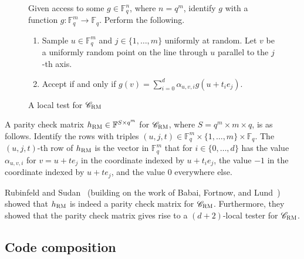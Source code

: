 \documentclass[11pt]{article}
\newtheorem{theorem}{Theorem}[section]
\theoremstyle{definition}
\newcommand{\code}{\mathscr{C}}
\newcommand{\F}{\ensuremath{\mathbb{F}}}
\newcommand{\mX}{\ensuremath{\mathcal{X}}}
\newcommand{\RM}{\ensuremath{\textsc{RM}}}
\DeclareMathOperator{\poly}{poly}
\newcommand{\eps}{\varepsilon}
\newenvironment{gamespec}{
  \begin{mdframed}[style=figstyle]}{
  \end{mdframed}}
\begin{document}
\begin{figure}[!htbp]
  \centering
  \begin{gamespec}
Given access to some $g\in \F_q^n$, where $n=q^m$, identify $g$ with a function $g:\F_q^m\to \F_q$. Perform the following.
\begin{enumerate}
	\item Sample	$u\in \F_q^m$ and $j\in \{1,\ldots,m\}$ uniformly at random. Let $v$ be a uniformly random point on the line through $u$ parallel to the $j$-th axis.
	\item 
	Accept if and only if $g(v) = \sum_{i=0}^{d} \alpha_{u,v,i} g(u+t_i e_j)$. 
    \end{enumerate}
  \end{gamespec}
  \caption{A local test for $\code_{\RM}$}
  \label{fig:RM-tester}
\end{figure}

A parity check matrix $h_{\RM} \in \F^{S \times q^m}$ for $\code_{\RM}$, where $S = q^m \times m \times q$, is as follows. Identify the rows with triples $(u,j,t) \in \F_q^m \times \{1,\ldots,m\} \times \F_q$. The $(u,j,t)$-th row of $h_{\RM}$ is the vector in $\F_q^m$ that for $i \in \{0,\ldots,d\}$ has the value $\alpha_{u,v,i}$ for $v = u + t e_j$ in the coordinate indexed by $u + t_i e_j$, the value $-1$ in the coordinate indexed by $u + te_j$, and the value $0$ everywhere else. 

Rubinfeld and Sudan~\cite{rubinfeld1996robust} (building on the work of Babai, Fortnow, and Lund~\cite{babai1991non}) showed that $h_{\RM}$ is indeed a parity check matrix for $\code_{\RM}$. Furthermore, they showed that the parity check matrix gives rise to a $(d+2)$-local tester for $\code_{\RM}$. 




\subsection{Code composition}
\label{sec:code-comp}
\end{document}
